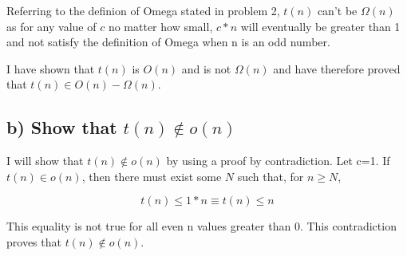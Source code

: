 \documentclass[11pt]{article}
\begin{document}
\bigskip
Referring to the definion of Omega stated in problem 2, $t(n)$ can't be $\Omega (n)$ as for any value of $c$ no matter how small, $c*n$ will eventually be greater than 1 and not satisfy the definition of Omega when n is an odd number.

\bigskip
I have shown that $t(n)$ is $O(n)$ and is not $\Omega (n)$ and have therefore proved that $t(n) \in O(n) - \Omega(n)$.


\subsection*{b) Show that $t(n) \notin o(n)$}
I will show that $t(n) \notin o(n)$ by using a proof by contradiction. Let c=1. If $t(n) \in o(n)$, then there must exist some $N$ such that, for $n \geq N$,

\begin{equation*}
t(n) \leq 1*n \equiv t(n) \leq n
\end{equation*}

This equality is not true for all even n values greater than 0. This contradiction proves that $t(n) \notin o(n)$.














\end{document}
